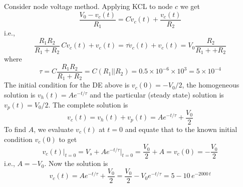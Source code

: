 \usepackage{html}




Consider node voltage method. Applying KCL to node $c$ 
we get
\[
\frac{V_0-v_c(t)}{R_1}=C\dot{v}_c(t)+\frac{v_c(t)}{R_2}
\]
i.e.,
\[
\frac{R_1R_2}{R_1+R_2}\,C\dot{v}_c(t)+v_c(t)
=\tau\dot{v}_c(t)+v_c(t)=V_0\frac{R_2}{R_1++R_2}
\]
where 
\[
\tau=C\frac{R_1R_2}{R_1+R_2}=C(R_1||R_2)
=0.5\times 10^{-6}\times 10^3=5\times 10^{-4}
\]
The initial condition for the DE above is $v_c(0)=-V_0/2$, the
homogeneous solution is $v_h(t)=Ae^{-t/\tau}$ and the particular 
(steady state) solution is $v_p(t)=V_0/2$. The complete solution 
is 
\[
v_c(t)=v_h(t)+v_p(t)=Ae^{-t/\tau}+\frac{V_0}{2}
\]
To find $A$, we evaluate $v_c(t)$ at $t=0$ and equate that to the
known initial condition $v_c(0)$ to get
\[
v_c(t)\bigg|_{t=0}=V_s+Ae^{-t/\tau}\bigg|_{t=0}=\frac{V_0}{2}+A
=v_c(0)=-\frac{V_0}{2}
\]
i.e., $A=-V_0$. Now the solution is
\[
v_c(t)=Ae^{-t/\tau}+\frac{V_0}{2}
=\frac{V_0}{2}-V_0 e^{-t/\tau}=5-10\,e^{-2000\,t}
\]



